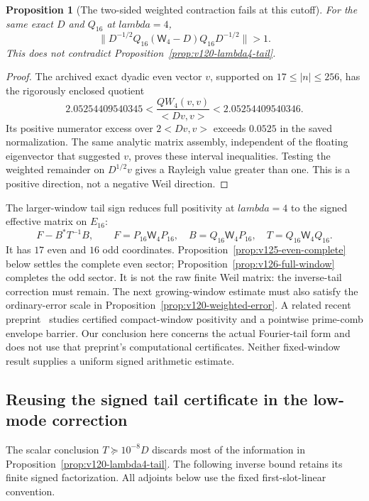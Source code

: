 \documentclass[11pt]{article}
\def\lambda{lambda}%
\def\ip#1#2{<#1,#2>}%
\newtheorem{proposition}[theorem]{Proposition}
\theoremstyle{remark}
\newcommand{\ip}[2]{\left\langle #1,#2\right\rangle}
\begin{document}
\begin{proposition}[The two-sided weighted contraction fails at this cutoff]
\label{prop:v120-norm-counterexample}
For the same exact $D$ and $Q_{16}$ at $\lambda=4$,
\[
 \|D^{-1/2}Q_{16}(\mathsf W_4-D)Q_{16}D^{-1/2}\|>1.
\]
This does not contradict Proposition~\ref{prop:v120-lambda4-tail}.
\end{proposition}
\begin{proof}
The archived exact dyadic even vector $v$, supported on
$17\le|n|\le256$, has the rigorously enclosed quotient
\[
 2.05254409540345<\frac{QW_4(v,v)}{\ip{Dv}{v}}
                         <2.05254409540346.
\]
Its positive numerator excess over $2\ip{Dv}{v}$ exceeds
$0.0525$ in the saved normalization. The same analytic matrix
assembly, independent of the floating eigenvector that suggested
$v$, proves these interval inequalities. Testing the weighted
remainder on $D^{1/2}v$ gives a Rayleigh value greater than one.
This is a positive direction, not a negative Weil direction.
\end{proof}

The larger-window tail sign reduces full positivity at $\lambda=4$
to the signed effective matrix on
$E_{16}$:
\[
 F-B^*T^{-1}B,\qquad
 F=P_{16}\mathsf W_4P_{16},\quad B=Q_{16}\mathsf W_4P_{16},
 \quad T=Q_{16}\mathsf W_4Q_{16}.
\]
It has $17$ even and $16$ odd coordinates.
Proposition~\ref{prop:v125-even-complete} below settles the complete
even sector; Proposition~\ref{prop:v126-full-window} completes the
odd sector. It is not the raw finite
Weil matrix: the inverse-tail correction must remain.
The next growing-window estimate must also satisfy the ordinary-error
scale in Proposition~\ref{prop:v120-weighted-error}.
A related recent preprint~\cite{Zhu2026} studies certified
compact-window positivity and a pointwise prime-comb envelope barrier.
Our conclusion here concerns the actual Fourier-tail form and does
not use that preprint's computational certificates. Neither fixed-window
result supplies a uniform signed arithmetic estimate.

\subsection{Reusing the signed tail certificate in the low-mode correction}
The scalar conclusion $T\succeq10^{-8}D$ discards most of the
information in Proposition~\ref{prop:v120-lambda4-tail}. The following
inverse bound retains its finite signed factorization. All adjoints
below use the fixed first-slot-linear convention.
\end{document}
